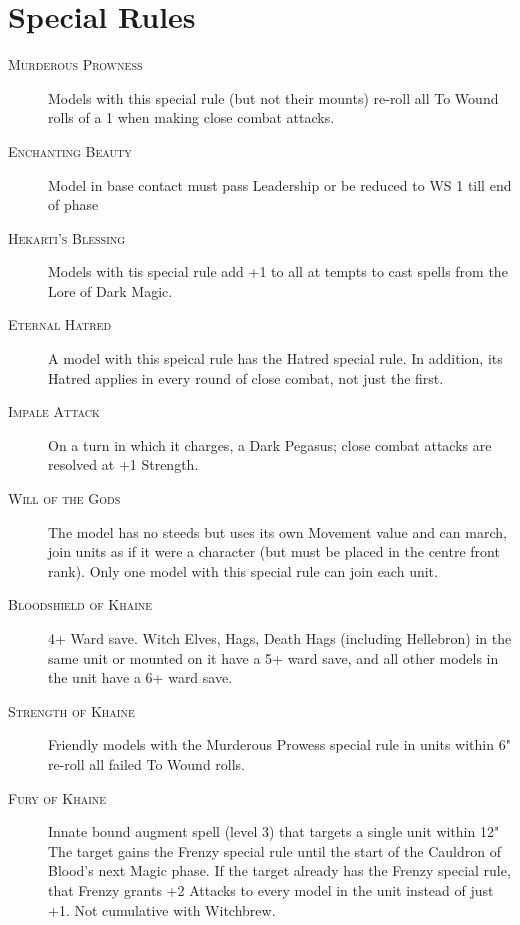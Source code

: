 \section*{Special Rules}
\marginpar{}
\begin{description}
\item[\textsc{Murderous Prowness}]\label{rule:murderousprowness} Models with this special rule (but not their mounts) re-roll all To Wound rolls of a 1 when making close combat attacks.
\item[\textsc{Enchanting Beauty}]\label{rule:enchantingbeauty} Model in base contact must pass Leadership or be reduced to WS 1 till end of phase
\item[\textsc{Hekarti's Blessing}]\label{rule:hekbless} Models with tis special rule add +1 to all at tempts to cast spells from the Lore of Dark Magic.  
\item[\textsc{Eternal Hatred}]\label{rule:eternalhatred} A model with this speical rule has the Hatred\hyperref[rule:hatred]{\dragon} special rule. In addition, its Hatred applies in every round of close combat, not just the first.
\item[\textsc{Impale Attack}]\label{rule:impaleattack} On a turn in which it charges, a Dark Pegasus; close combat attacks are resolved at +1 Strength. 
\item[\textsc{Will of the Gods}]\label{rule:willofgods} The model has no steeds but uses its own Movement value and can march, join units as if it were a character (but must be placed in the centre front rank). Only one model with this special rule can join each unit.
\item[\textsc{Bloodshield of Khaine}]\label{rule:bloodshield} 4+ Ward save. Witch Elves, Hags, Death Hags (including Hellebron) in the same unit or mounted on it have a 5+ ward save, and all other models in the unit have a 6+ ward save.
\item[\textsc{Strength of Khaine}]\label{rule:strengthofkhaine} Friendly models with the Murderous Prowess\hyperref[rule:murderousprowness]{\dragon} special rule in units within 6" re-roll all failed To Wound rolls. 
\item[\textsc{Fury of Khaine}]\label{rule:furyofkhaine} Innate bound augment spell (level 3) that targets a single unit within 12" The target gains the Frenzy\hyperref[rule:frenzy]{\dragon} special rule until the start of the Cauldron of Blood's next Magic phase. If the target already has the Frenzy special rule, that Frenzy grants +2 Attacks to every model in the unit instead of just +1. Not cumulative with Witchbrew.

\end{description}
